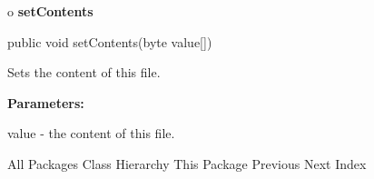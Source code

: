 o {\bf setContents} 

\begin{PRE}
 public void setContents(byte value[])
\end{PRE}

\begin{description}
\htmlDD Sets the content of this file. 

\begin{description}
\item {\bf Parameters:}  

value - the content of this file.  
\end{description}

\end{description}

\htmlHR

\begin{PRE}
All Packages  Class Hierarchy  This Package  Previous  Next  Index
\end{PRE}


